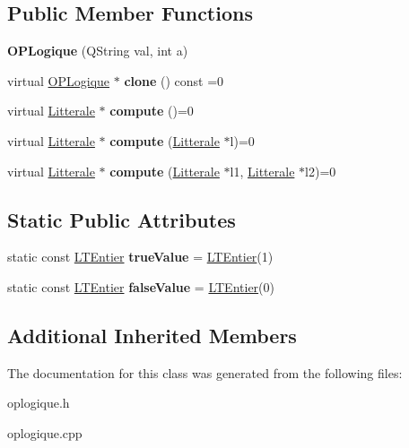 \subsection*{Public Member Functions}
\begin{DoxyCompactItemize}
\item 
{\bfseries O\+P\+Logique} (Q\+String val, int a)\hypertarget{class_o_p_logique_a38e1e9c66c277efbfb94170f86125946}{}\label{class_o_p_logique_a38e1e9c66c277efbfb94170f86125946}

\item 
virtual \hyperlink{class_o_p_logique}{O\+P\+Logique} $\ast$ {\bfseries clone} () const  =0\hypertarget{class_o_p_logique_a4ea4669b0167724dcfa6e5919560214c}{}\label{class_o_p_logique_a4ea4669b0167724dcfa6e5919560214c}

\item 
virtual \hyperlink{class_litterale}{Litterale} $\ast$ {\bfseries compute} ()=0\hypertarget{class_o_p_logique_a2c8b58eb448f57fec28785fbe8118c64}{}\label{class_o_p_logique_a2c8b58eb448f57fec28785fbe8118c64}

\item 
virtual \hyperlink{class_litterale}{Litterale} $\ast$ {\bfseries compute} (\hyperlink{class_litterale}{Litterale} $\ast$l)=0\hypertarget{class_o_p_logique_a0077e7dd288f03fe71dd4b948a7703c8}{}\label{class_o_p_logique_a0077e7dd288f03fe71dd4b948a7703c8}

\item 
virtual \hyperlink{class_litterale}{Litterale} $\ast$ {\bfseries compute} (\hyperlink{class_litterale}{Litterale} $\ast$l1, \hyperlink{class_litterale}{Litterale} $\ast$l2)=0\hypertarget{class_o_p_logique_aa29609988592fc385df0ff2ea6c7813d}{}\label{class_o_p_logique_aa29609988592fc385df0ff2ea6c7813d}

\end{DoxyCompactItemize}
\subsection*{Static Public Attributes}
\begin{DoxyCompactItemize}
\item 
static const \hyperlink{class_l_t_entier}{L\+T\+Entier} {\bfseries true\+Value} = \hyperlink{class_l_t_entier}{L\+T\+Entier}(1)\hypertarget{class_o_p_logique_a7d3a0ae1fe39b29c353a32e2dbbca575}{}\label{class_o_p_logique_a7d3a0ae1fe39b29c353a32e2dbbca575}

\item 
static const \hyperlink{class_l_t_entier}{L\+T\+Entier} {\bfseries false\+Value} = \hyperlink{class_l_t_entier}{L\+T\+Entier}(0)\hypertarget{class_o_p_logique_afb2af55eef8d0bc62494b8654bf3f949}{}\label{class_o_p_logique_afb2af55eef8d0bc62494b8654bf3f949}

\end{DoxyCompactItemize}
\subsection*{Additional Inherited Members}


The documentation for this class was generated from the following files\+:\begin{DoxyCompactItemize}
\item 
oplogique.\+h\item 
oplogique.\+cpp\end{DoxyCompactItemize}
